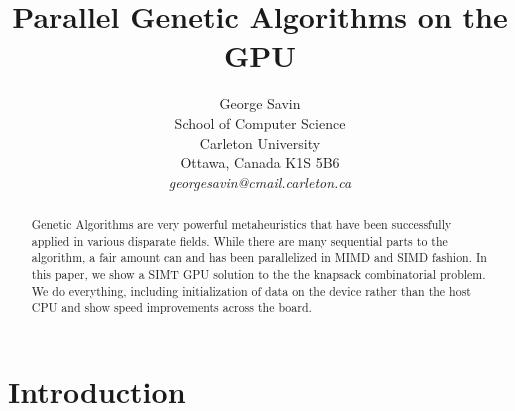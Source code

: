 \documentclass[11pt]{article}       %
\begin{document}


\title{Parallel Genetic Algorithms on the GPU}


\author{
George Savin\\
School of Computer Science\\
Carleton University\\
Ottawa, Canada K1S 5B6\\
{\em georgesavin@cmail.carleton.ca}
} %

\maketitle

\begin{abstract}
Genetic Algorithms are very powerful metaheuristics that have been successfully applied in  various disparate fields. While there are many sequential parts to the algorithm, a fair amount can and has been parallelized in MIMD and SIMD fashion. In this paper, we show a SIMT GPU solution to the the knapsack combinatorial problem. We do everything, including initialization of data on the device rather than the host CPU and show speed improvements across the board.
\end{abstract}

\section{Introduction} \label{intro}
\end{document}
